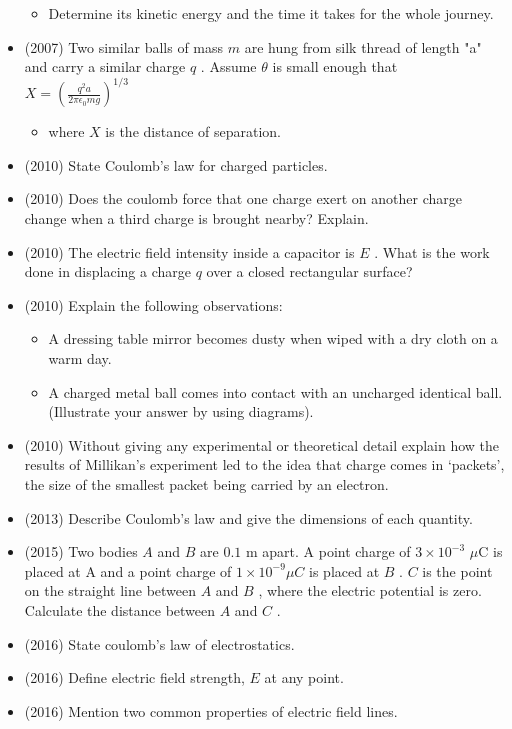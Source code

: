 \documentclass{article}
\begin{document}
\begin{itemize}
\begin{itemize}
\item Determine its kinetic energy and the time it takes for the whole journey.
\end{itemize}
\item (2007)  Two similar balls of mass $ m$ are hung from silk thread of length "a" and carry a similar charge $ q$ .  Assume $ \theta $ is small enough that $ X = (\frac{q^2 a}{2 \pi \epsilon_0 m g})^{1/3}$\begin{itemize}
\item where $ X$ is the distance of separation.
\end{itemize}
\item (2010)  State Coulomb’s law for charged particles.
\item (2010)  Does the coulomb force that one charge exert on another charge change when a third charge is brought nearby? Explain.
\item (2010)  The electric field intensity inside a capacitor is $ E$ . What is the work done in displacing a charge $ q$ over a closed rectangular surface?
\item (2010)  Explain the following observations:\begin{itemize}
\item A dressing table mirror becomes dusty when wiped with a dry cloth on a warm day.
\item A charged metal ball comes into contact with an uncharged identical ball.  (Illustrate your answer by using diagrams).
\end{itemize}
\item (2010)  Without giving any experimental or theoretical detail explain how the results of Millikan’s experiment led to the idea that charge comes in ‘packets’, the size of the smallest packet being carried by an electron. 
\item (2013)  Describe Coulomb’s law and give the dimensions of each quantity.
\item (2015)  Two bodies $ A$ and $ B$ are $ 0.1$ m apart.  A point charge of $ 3\times 10^{-3}$ $\mu$C is placed at A and a point charge of $ 1\times 10^{-9}\mu C$ is placed at $ B$ .  $ C$ is the point on the straight line between $ A$ and $ B$ , where the electric potential is zero.  Calculate the distance between $ A$ and $ C$ .
\item (2016)  State coulomb’s law of electrostatics.
\item (2016)  Define electric field strength, $ E$ at any point.
\item (2016)  Mention two common properties of electric field lines.

\end{itemize}
\end{document}
